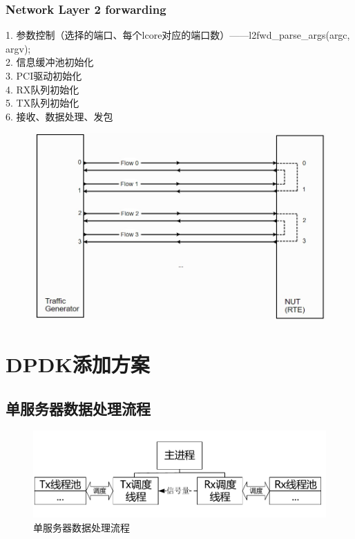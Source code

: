 \documentclass{article}
\begin{document}
\subsubsection{Network Layer 2 forwarding}
1. 参数控制（选择的端口、每个lcore对应的端口数）——l2fwd\_parse\_args(argc, argv);\\
2. 信息缓冲池初始化\\
3. PCI驱动初始化\\
4. RX队列初始化\\
5. TX队列初始化\\
6. 接收、数据处理、发包
\begin{figure}[H]
	\centering
	\includegraphics[width = .8\textwidth]{frame_l2f.jpg}
\end{figure}

\section{DPDK添加方案}

\subsection{单服务器数据处理流程}
\begin{figure}[H]
	\centering
	\includegraphics[width = \textwidth]{frame_step1.pdf}
	\caption{单服务器数据处理流程}
\end{figure}
\end{document}
